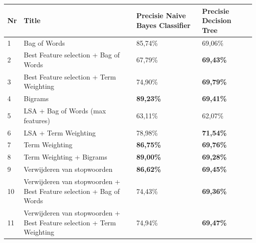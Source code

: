 \begin{table}[H]
\centering
\begin{adjustbox}{width=1\textwidth}
\begin{tabular}{|l|l|l|l|}
\hline
{\bf Nr} & {\bf Title}                                                                       & {\bf Precisie Naive Bayes Classifier} & {\bf Precisie Decision Tree} \\ \hline
1        & Bag of Words                                                                        & 85,74\%                                 & 69,06\%                        \\ \hline
2        & Best Feature selection + Bag of Words                               & 67,79\%                                 & {\bf 69,43\%}                  \\ \hline
3        & Best Feature selection + Term Weighting                                    & 74,90\%                                 & {\bf 69,79\%}                  \\ \hline
4        & Bigrams                                                                  & {\bf 89,23\%}                           & {\bf 69,41\%}                  \\ \hline
5        & LSA + Bag of Words (max features)                                                  & 63,11\%                                 & 62,07\%                        \\ \hline
6        & LSA + Term Weighting                                                        & 78,98\%                                 & {\bf 71,54\%}                  \\ \hline
7        & Term Weighting                                                                      & {\bf 86,75\%}                           & {\bf 69,76\%}                  \\ \hline
8        & Term Weighting + Bigrams                                                            & {\bf 89,00\%}                           & {\bf 69,28\%}                  \\ \hline
9        & Verwijderen van stopwoorden                                                         & {\bf 86,62\%}                           & {\bf 69,45\%}                  \\ \hline
10        & Verwijderen van stopwoorden + Best Feature selection + Bag of Words & 74,43\%                                 & {\bf 69,36\%}                  \\ \hline
11       & Verwijderen van stopwoorden + Best Feature selection + Term Weighting        & 74,94\%                                 & {\bf 69,47\%}                  \\ \hline

\end{tabular}
\end{adjustbox}
\end{table}
